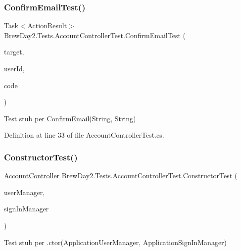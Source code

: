 \subsubsection{\texorpdfstring{Confirm\+Email\+Test()}{ConfirmEmailTest()}}
{\footnotesize\ttfamily Task$<$Action\+Result$>$ Brew\+Day2.\+Tests.\+Account\+Controller\+Test.\+Confirm\+Email\+Test (\begin{DoxyParamCaption}\item[{\mbox{[}\+Pex\+Assume\+Under\+Test\mbox{]} \mbox{\hyperlink{class_brew_day2_1_1_controllers_1_1_account_controller}{Account\+Controller}}}]{target,  }\item[{string}]{user\+Id,  }\item[{string}]{code }\end{DoxyParamCaption})}



Test stub per Confirm\+Email(\+String, String)



Definition at line 33 of file Account\+Controller\+Test.\+cs.

\mbox{\label{class_brew_day2_1_1_tests_1_1_account_controller_test_a0bf43e2f6dcae601f8139a1420bd2e69}} 
\subsubsection{\texorpdfstring{Constructor\+Test()}{ConstructorTest()}}
{\footnotesize\ttfamily \mbox{\hyperlink{class_brew_day2_1_1_controllers_1_1_account_controller}{Account\+Controller}} Brew\+Day2.\+Tests.\+Account\+Controller\+Test.\+Constructor\+Test (\begin{DoxyParamCaption}\item[{\mbox{\hyperlink{class_brew_day2_1_1_application_user_manager}{Application\+User\+Manager}}}]{user\+Manager,  }\item[{\mbox{\hyperlink{class_brew_day2_1_1_application_sign_in_manager}{Application\+Sign\+In\+Manager}}}]{sign\+In\+Manager }\end{DoxyParamCaption})}



Test stub per .ctor(\+Application\+User\+Manager, Application\+Sign\+In\+Manager)



